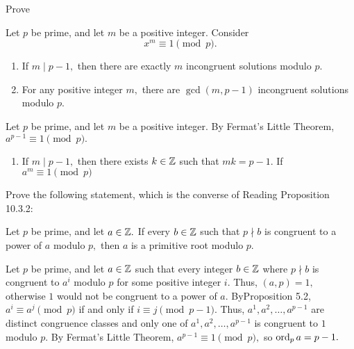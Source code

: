 \documentclass[handout]{ximera}
\begin{document}
\begin{br} Prove
    \begin{proposition}[Proposition 10.2.2]\label{read-prop:roots-unity}
        Let $p$ be prime, and let $m$ be a positive integer. Consider \[x^m\equiv 1\pmod{p}.\]
        
        \begin{enumerate}
            \item If $m\mid p-1,$ then there are exactly $m$ incongruent solutions modulo $p.$
            \item For any positive integer $m,$ there are $\gcd(m,p-1)$ incongruent solutions modulo $p.$
        \end{enumerate}
    \end{proposition}

    \begin{solution}
        Let $p$ be prime, and let $m$ be a positive integer. By Fermat's Little Theorem, $a^{p-1}\equiv 1\pmod{p}.$

        \begin{enumerate}
            \item If $m\mid p-1,$ then there exists $k\in\mathbb Z$ such that $mk=p-1.$ If $a^m\equiv 1\pmod{p}$
        \end{enumerate}
    \end{solution}
    \pdfOnly{\ifhandout
        \vfill
        \else\fi}
\end{br}

\pdfOnly{\ifhandout
        \pagebreak
        \else\fi}

\begin{br}
    Prove the following statement, which is the converse of Reading Proposition 10.3.2:

    Let $p$ be prime, and let $a\in\mathbb Z.$ If every $b\in\mathbb Z$ such that $p\nmid b$ is congruent to a power of $a$ modulo $p,$ then ${a}$ is a primitive root modulo $p$.
    
    \begin{solution}
        Let $p$ be prime, and let $a\in\mathbb Z$ such that every integer $b\in\mathbb Z$ where $p\nmid b$ is congruent to $a^i$ modulo $p$ for some positive integer $i$. Thus, $(a,p)=1,$ otherwise $1$ would not be congruent to a power of $a$. ByProposition 5.2, $a^i\equiv a^j\pmod{p}$ if and only if $i\equiv j\pmod{p-1}.$ Thus, $a^1,a^2,\dots,a^{p-1}$ are distinct congruence classes and only one of $a^1,a^2,\dots,a^{p-1}$ is congruent to $1$ modulo $p.$ By Fermat's Little Theorem, $a^{p-1}\equiv1\pmod{p},$ so $\operatorname{ord}_p a=p-1.$
    \end{solution}
    \pdfOnly{\ifhandout
        \vfill
        \else\fi}
\end{br}
\end{document}
